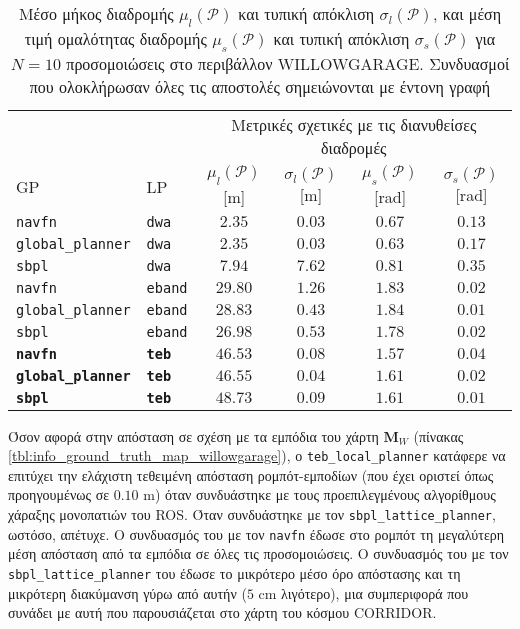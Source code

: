 \begin{table}[h]
\renewcommand{\arraystretch}{1.3}
\begin{tabular}{llcccc}
  & & \multicolumn{4}{c}{Μετρικές σχετικές με τις διανυθείσες διαδρομές} \\
  \cline{3-6}
  GP & LP & $\mu_{l}(\bm{\mathcal{P}})$ [m] & $\sigma_{l}(\bm{\mathcal{P}})$ [m] & $\mu_{s}(\bm{\mathcal{P}})$ [rad] & $\sigma_{s}(\bm{\mathcal{P}})$ [rad] \\ \toprule
  \texttt{navfn} & \texttt{dwa} & $2.35$ & $0.03$ & $0.67$ & $0.13$ \\
  \texttt{global\_planner} & \texttt{dwa} & $2.35$ & $0.03$ & $0.63$ & $0.17$ \\
  \texttt{sbpl} & \texttt{dwa} & $7.94$ & $7.62$ & $0.81$ & $0.35$ \\
  \texttt{navfn} & \texttt{eband} & $29.80$ & $1.26$ & $1.83$ & $0.02$ \\
  \texttt{global\_planner} & \texttt{eband} & $28.83$ & $0.43$ & $1.84$ & $0.01$ \\
  \texttt{sbpl} & \texttt{eband} & $26.98$ & $0.53$ & $1.78$ & $0.02$ \\
  \textbf{\texttt{navfn}} & \textbf{\texttt{teb}} & $\bm{46.53}$ & $\bm{0.08}$ & $\bm{1.57}$ & $\bm{0.04}$ \\
  \textbf{\texttt{global\_planner}} & \textbf{\texttt{teb}} & $\bm{46.55}$ & $\bm{0.04}$ & $\bm{1.61}$ & $\bm{0.02}$ \\
  \textbf{\texttt{sbpl}} & \textbf{\texttt{teb}} & $\bm{48.73}$ & $\bm{0.09}$ & $\bm{1.61}$ & $\bm{0.01}$ \\ \bottomrule
\end{tabular}
\caption{\small Μέσο μήκος διαδρομής $\mu_{l}(\bm{\mathcal{P}})$ και τυπική
         απόκλιση $\sigma_{l}(\bm{\mathcal{P}})$, και μέση τιμή ομαλότητας
         διαδρομής $\mu_{s}(\bm{\mathcal{P}})$ και τυπική απόκλιση
         $\sigma_{s}(\bm{\mathcal{P}})$ για $N=10$ προσομοιώσεις στο περιβάλλον
         WILLOWGARAGE. Συνδυασμοί που ολοκλήρωσαν όλες τις αποστολές
         σημειώνονται με έντονη γραφή}
\label{tbl:info_ground_truth_willowgarage}
\end{table}

Όσον αφορά στην απόσταση σε σχέση με τα εμπόδια του χάρτη $\bm{M}_W$ (πίνακας
\ref{tbl:info_ground_truth_map_willowgarage}), ο \texttt{teb\_local\_planner}
κατάφερε να επιτύχει την ελάχιστη τεθειμένη απόσταση ρομπότ-εμποδίων
(που έχει οριστεί όπως προηγουμένως σε $0.10$ m) όταν συνδυάστηκε με τους
προεπιλεγμένους αλγορίθμους χάραξης μονοπατιών του ROS. Όταν συνδυάστηκε με τον
\texttt{sbpl\_lattice\_planner}, ωστόσο, απέτυχε. Ο συνδυασμός του με
τον \texttt{navfn} έδωσε στο ρομπότ τη μεγαλύτερη μέση απόσταση από τα εμπόδια
σε όλες τις προσομοιώσεις. Ο συνδυασμός του με τον
\texttt{sbpl\_lattice\_planner} του έδωσε το μικρότερο μέσο όρο απόστασης και
τη μικρότερη διακύμανση γύρω από αυτήν ($5$ cm λιγότερο), μια συμπεριφορά που
συνάδει με αυτή που παρουσιάζεται στο χάρτη του κόσμου CORRIDOR.

